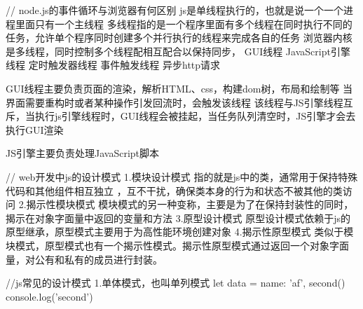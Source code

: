 // node.js的事件循环与浏览器有何区别
js是单线程执行的，也就是说一个一个进程里面只有一个主线程
多线程指的是一个程序里面有多个线程在同时执行不同的任务，允许单个程序同时创建多个并行执行的线程来完成各自的任务
浏览器内核是多线程，同时控制多个线程配相互配合以保持同步，
GUI线程
JavaScript引擎线程
定时触发器线程
事件触发线程
异步http请求

GUI线程主要负责页面的渲染，解析HTML、css，构建dom树，布局和绘制等
当界面需要重构时或者某种操作引发回流时，会触发该线程
该线程与JS引擎线程互斥，当执行js引擎线程时，GUI线程会被挂起，当任务队列清空时，JS引擎才会去执行GUI渲染

JS引擎主要负责处理JavaScript脚本

// web开发中js的设计模式
1.模块设计模式
指的就是js中的类，通常用于保持特殊代码和其他组件相互独立 ，互不干扰，确保类本身的行为和状态不被其他的类访问
2.揭示性模块模式
模块模式的另一种变称，主要是为了在保持封装性的同时，揭示在对象字面量中返回的变量和方法
3.原型设计模式
原型设计模式依赖于js的原型继承，原型模式主要用于为高性能环境创建对象
4.揭示性原型模式
类似于模块模式，原型模式也有一个揭示性模式。揭示性原型模式通过返回一个对象字面量，对公有和私有的成员进行封装。

//js常见的设计模式
1.单体模式，也叫单列模式
let data = {
  name: 'af',
  second() {
    console.log('second')
 }
}



